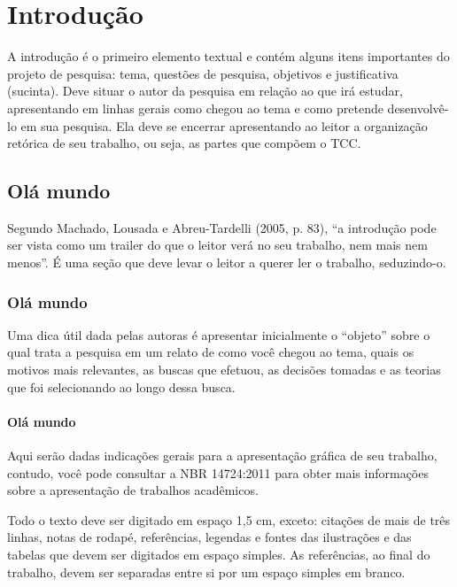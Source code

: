 
\chapter{Introdução}

A introdução é o primeiro elemento textual e contém alguns itens importantes do projeto de pesquisa: tema, questões de pesquisa, objetivos e justificativa (sucinta). Deve situar o autor da pesquisa em relação ao que irá estudar, apresentando em linhas gerais como chegou ao tema e como pretende desenvolvê-lo em sua pesquisa. Ela deve se encerrar apresentando ao leitor a organização retórica de seu trabalho, ou seja, as partes que compõem o TCC.

\section{Olá mundo}

Segundo Machado, Lousada e Abreu-Tardelli (2005, p. 83), “a introdução pode ser vista como um trailer do que o leitor verá no seu trabalho, nem mais nem menos”. É uma seção que deve levar o leitor a querer ler o trabalho, seduzindo-o.

\subsection{Olá mundo}

Uma dica útil dada pelas autoras é apresentar inicialmente o “objeto” sobre o qual trata a pesquisa em um relato de como você chegou ao tema, quais os motivos mais relevantes, as buscas que efetuou, as decisões tomadas e as teorias que foi selecionando ao longo dessa busca. 

\subsubsection{Olá mundo}

Aqui serão dadas indicações gerais para a apresentação gráfica de seu trabalho, contudo, você pode consultar a NBR 14724:2011 para obter mais informações sobre a apresentação de trabalhos acadêmicos.


Todo o texto deve ser digitado em espaço 1,5 cm, exceto: citações de mais de três linhas, notas de rodapé, referências, legendas e fontes das ilustrações e das tabelas que devem ser digitados em espaço simples. As referências, ao final do trabalho, devem ser separadas entre si por um espaço simples em branco.

